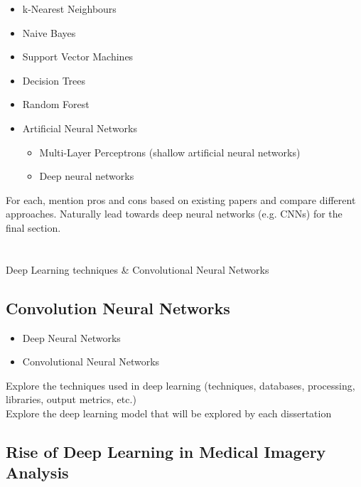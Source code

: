 \begin{itemize}
    \item k-Nearest Neighbours
    \item Naive Bayes
    \item Support Vector Machines
    \item Decision Trees
    \item Random Forest
    \item Artificial Neural Networks
    \begin{itemize}
        \item Multi-Layer Perceptrons (shallow artificial neural networks)
        \item Deep neural networks
    \end{itemize}
\end{itemize}

For each, mention pros and cons based on existing papers and compare different approaches. Naturally lead towards deep neural networks (e.g. CNNs) for the final section.


\section{}{Deep Learning techniques \& Convolutional Neural Networks}

\subsection{Convolution Neural Networks}

\begin{itemize}
    \item Deep Neural Networks
    \item Convolutional Neural Networks
\end{itemize}

Explore the techniques used in deep learning (techniques, databases, processing, libraries, output metrics, etc.)\\
Explore the deep learning model that will be explored by each dissertation

\subsection{Rise of Deep Learning in Medical Imagery Analysis}

